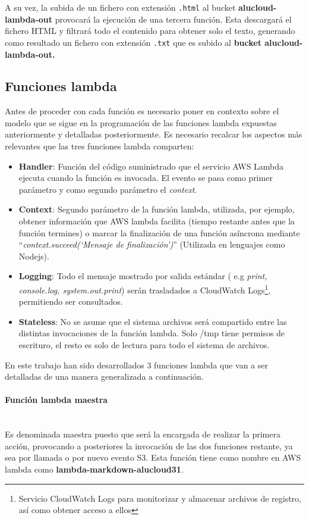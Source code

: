 \documentclass[
]{article}
\begin{document}
A su vez, la subida de un fichero con extensión \texttt{.html} al bucket
\textbf{alucloud-lambda-out} provocará la ejecución de una tercera
función. Esta descargará el fichero HTML y filtrará todo el contenido
para obtener solo el texto, generando como resultado un fichero con
extensión \texttt{.txt} que es subido al \textbf{bucket
alucloud-lambda-out.}
\newpage
\hypertarget{header-n24}{%
\subsection{\texorpdfstring{Funciones lambda
}{Funciones lambda }}\label{header-n24}}
Antes de proceder con cada función es necesario poner en contexto sobre
el modelo que se sigue en la programación de las funciones lambda
expuestas anteriormente y detalladas posteriormente. Es necesario
recalcar los aspectos más relevantes que las tres funciones lambda
comparten:

\begin{itemize}
\item
  \textbf{Handler}: Función del código suministrado que el servicio AWS
  Lambda ejecuta cuando la función es invocada. El evento se pasa como
  primer parámetro y como segundo parámetro el \emph{context}.
\item
  \textbf{Context}: Segundo parámetro de la función lambda, utilizada,
  por ejemplo, obtener información que AWS lambda facilita (tiempo
  restante antes que la función termines) o marcar la finalización de
  una función asíncrona mediante ``\emph{context.succeed(`Mensaje de
  finalización')}'' (Utilizada en lenguajes como Nodejs).
\item
  \textbf{Logging}: Todo el mensaje mostrado por salida estándar ( e.g
  \emph{print, console.log, system.out.print}) serán trasladados a
  CloudWatch Logs\footnote{Servicio CloudWatch Logs para monitorizar y
    almacenar archivos de registro, así como obtener acceso a ellos},
  permitiendo ser consultados.
\item
  \textbf{Stateless}: No se asume que el sistema archivos será
  compartido entre las distintas invocaciones de la función lambda. Solo
  /tmp tiene permisos de escrituro, el resto es solo de lectura para
  todo el sistema de archivos.
\end{itemize}

En este trabajo han sido desarrollados 3 funciones lambda que van a ser
detalladas de una manera generalizada a continuación.

\hypertarget{header-n39}{%
\paragraph{Función lambda maestra}\label{header-n39}}
\leavevmode
\newline
\\
Es denominada maestra puesto que será la encargada de realizar la
primera acción, provocando a posteriores la invocación de las dos
funciones restante, ya sea por llamada o por nuevo evento S3. Esta
función tiene como nombre en AWS lambda como
\textbf{lambda-markdown-alucloud31}.
\end{document}
